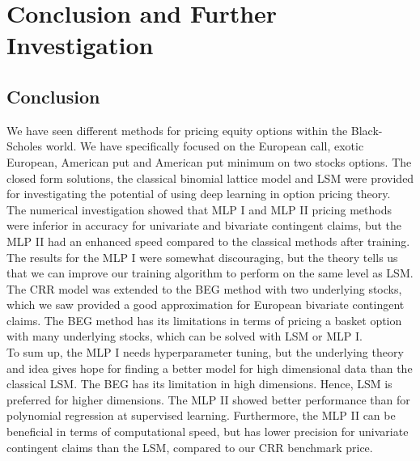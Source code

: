 
\chapter{Conclusion and Further Investigation} %

\label{Chapter7} %


\section{Conclusion}
We have seen different methods for pricing equity options within the Black-Scholes world. We have specifically focused on the European call, exotic European, American put and American put minimum on two stocks options. The closed form solutions, the classical binomial lattice model and LSM were provided for investigating the potential of using deep learning in option pricing theory. \\

The numerical investigation showed that MLP I and MLP II pricing methods were inferior in accuracy for univariate and bivariate contingent claims, but the MLP II had an enhanced speed compared to the classical methods after training. The results for the MLP I were somewhat discouraging, but the theory tells us that we can improve our training algorithm to perform on the same level as LSM. The CRR model was extended to the BEG method with two underlying stocks, which we saw provided a good approximation for European bivariate contingent claims. The BEG method has its limitations in terms of pricing a basket option with many underlying stocks, which can be solved with LSM or MLP I.\\

To sum up, the MLP I needs hyperparameter tuning, but the underlying theory and idea gives hope for finding a better model for high dimensional data than the classical LSM. The BEG has its limitation in high dimensions. Hence, LSM is preferred for higher dimensions. The MLP II showed better performance than for polynomial regression at supervised learning. Furthermore, the MLP II can be beneficial in terms of computational speed, but has lower precision for univariate contingent claims than the LSM, compared to our CRR benchmark price.\\


